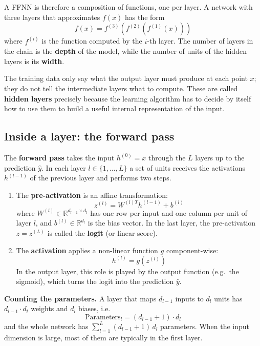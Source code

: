 A FFNN is therefore a composition of functions, one per layer. A network with
three layers that approximates $f(x)$ has the form
\begin{equation*}
    f(x) = f^{(3)}(f^{(2)}(f^{(1)}(x)))
\end{equation*}
where $f^{(i)}$ is the function computed by the $i$-th layer. The number of layers
in the chain is the \textbf{depth} of the model, while the number of units of the
hidden layers is its \textbf{width}.

The training data only say what the output layer must produce at each point $x$;
they do not tell the intermediate layers what to compute. These are called
\textbf{hidden layers} precisely because the learning algorithm has to decide by
itself how to use them to build a useful internal representation of the input.

\subsection{Inside a layer: the forward pass}
The \textbf{forward pass} takes the input $h^{(0)} = x$ through the $L$ layers up
to the prediction $\hat{y}$. In each layer $l \in \{1, \dots, L\}$ a set of units
receives the activations $h^{(l-1)}$ of the previous layer and performs two steps.
\begin{enumerate}
    \item The \textbf{pre-activation} is an affine transformation:
          \begin{equation}
              z^{(l)} = W^{(l)T} h^{(l-1)} + b^{(l)}
          \end{equation}
          where $W^{(l)} \in \mathbb{R}^{d_{l-1} \times d_l}$ has one row per input
          and one column per unit of layer $l$, and $b^{(l)} \in \mathbb{R}^{d_l}$ is
          the bias vector. In the last layer, the pre-activation $z = z^{(L)}$ is
          called the \textbf{logit} (or linear score).
    \item The \textbf{activation} applies a non-linear function $g$ component-wise:
          \begin{equation}
              h^{(l)} = g\left(z^{(l)}\right)
          \end{equation}
          In the output layer, this role is played by the output function (e.g.\
          the sigmoid), which turns the logit into the prediction $\hat{y}$.
\end{enumerate}

\begin{note}
    \textbf{Counting the parameters.} A layer that maps $d_{l-1}$ inputs to $d_l$
    units has $d_{l-1} \cdot d_l$ weights and $d_l$ biases, i.e.
    \begin{equation*}
        \text{Parameters}_l = \left(d_{l-1} + 1\right) \cdot d_l
    \end{equation*}
    and the whole network has $\sum_{l=1}^L (d_{l-1} + 1)\, d_l$ parameters. When
    the input dimension is large, most of them are typically in the first layer.
\end{note}

